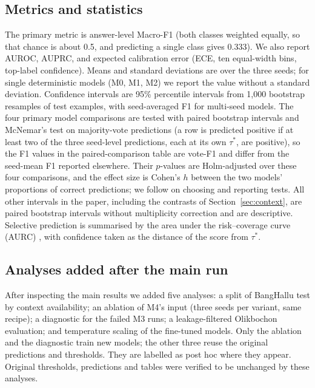 \documentclass[manuscript,screen,review]{acmart}
\begin{document}
\subsection{Metrics and statistics}
The primary metric is answer-level Macro-F1 (both classes weighted equally, so that chance is about 0.5, and predicting a single class gives 0.333). We also report AUROC, AUPRC, and expected calibration error \cite{guo2017calibration} (ECE, ten equal-width bins, top-label confidence). Means and standard deviations are over the three seeds; for single deterministic models (M0, M1, M2) we report the value without a standard deviation. Confidence intervals are 95\% percentile intervals from 1,000 bootstrap resamples of test examples, with seed-averaged F1 for multi-seed models. The four primary model comparisons are tested with paired bootstrap intervals \cite{bergkirkpatrick2012significance} and McNemar's test \cite{mcnemar1947note} on majority-vote predictions (a row is predicted positive if at least two of the three seed-level predictions, each at its own $\tau^*$, are positive), so the F1 values in the paired-comparison table are vote-F1 and differ from the seed-mean F1 reported elsewhere. Their $p$-values are Holm-adjusted \cite{holm1979sequential} over these four comparisons, and the effect size is Cohen's $h$ \cite{cohen1988power} between the two models' proportions of correct predictions; we follow \citet{dror2018hitchhiker} on choosing and reporting tests. All other intervals in the paper, including the contrasts of Section~\ref{sec:context}, are paired bootstrap intervals without multiplicity correction and are descriptive. Selective prediction is summarised by the area under the risk--coverage curve (AURC) \cite{geifman2017selective}, with confidence taken as the distance of the score from $\tau^*$.

\subsection{Analyses added after the main run}\label{sec:posthoc}
After inspecting the main results we added five analyses: a split of BangHallu test by context availability; an ablation of M4's input (three seeds per variant, same recipe); a diagnostic for the failed M3 runs; a leakage-filtered Olikbochon evaluation; and temperature scaling of the fine-tuned models. Only the ablation and the diagnostic train new models; the other three reuse the original predictions and thresholds. They are labelled as post hoc where they appear. Original thresholds, predictions and tables were verified to be unchanged by these analyses.
\end{document}
